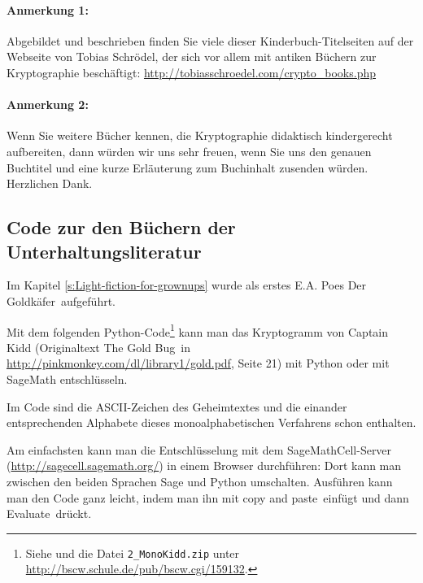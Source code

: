 \begin{description}

\end{description}%


\paragraph*{Anmerkung 1:}
Abgebildet und beschrieben finden Sie viele dieser Kinderbuch-Titelseiten
auf der Webseite von Tobias Schrödel, der sich vor allem mit
antiken Büchern zur Kryptographie beschäftigt:
   \url{http://tobiasschroedel.com/crypto_books.php}


\paragraph*{Anmerkung 2:}
Wenn Sie weitere Bücher kennen, die
Kryptographie didaktisch kindergerecht aufbereiten, dann würden wir
uns sehr freuen, wenn Sie uns den genauen Buchtitel und eine kurze
Erläuterung zum Buchinhalt zusenden würden. Herzlichen Dank.





\subsection{Code zur den Büchern der Unterhaltungsliteratur}
     \label{s:appendix-Code-for-light-fiction-books}

Im Kapitel \ref{s:Light-fiction-for-grownups} wurde als erstes E.A. Poes
\glqq Der Goldkäfer\grqq~aufgeführt.

Mit dem folgenden Python-Code\footnote{%
  Siehe \cite{Witten1998} und die Datei \verb|2_MonoKidd.zip| unter
  \url{http://bscw.schule.de/pub/bscw.cgi/159132}.
}
kann man das Kryptogramm von Captain Kidd (Originaltext \glqq The Gold Bug\grqq~in
\url{http://pinkmonkey.com/dl/library1/gold.pdf}, Seite 21) mit Python oder
mit SageMath entschlüsseln.

Im Code sind die ASCII-Zeichen des Geheimtextes und die einander entsprechenden
Alphabete dieses monoalphabetischen Verfahrens schon enthalten.

Am einfachsten kann man die Entschlüsselung mit dem SageMathCell-Server
(\url{http://sagecell.sagemath.org/}) in einem Browser durchführen:
Dort kann man zwischen den beiden Sprachen Sage und Python umschalten.
Ausführen kann man den Code ganz leicht, indem man ihn mit \glqq copy and
paste\grqq~einfügt und dann \glqq Evaluate\grqq~drückt.\\

